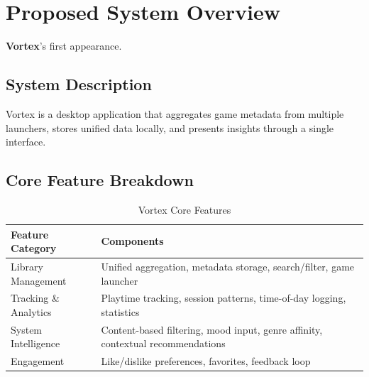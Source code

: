 \section{Proposed System Overview}
\textbf{Vortex}'s first appearance.

\subsection{System Description}
Vortex is a desktop application that aggregates game metadata from multiple launchers, stores unified data locally, and presents insights through a single interface.

\subsection{Core Feature Breakdown}

\begin{table}[h]
\centering
\begin{tabular}{|l|p{8cm}|}
\hline
\textbf{Feature Category} & \textbf{Components} \\
\hline
Library Management & Unified aggregation, metadata storage, search/filter, game launcher \\
\hline
Tracking \& Analytics & Playtime tracking, session patterns, time-of-day logging, statistics \\
\hline
System Intelligence & Content-based filtering, mood input, genre affinity, contextual recommendations \\
\hline
Engagement & Like/dislike preferences, favorites, feedback loop \\
\hline
\end{tabular}
\caption{Vortex Core Features}
\end{table}

